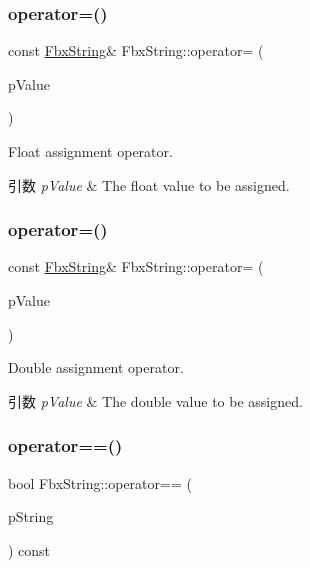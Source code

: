 \subsubsection{\texorpdfstring{operator=()}{operator=()}\hspace{0.1cm}{\footnotesize\ttfamily [5/6]}}
{\footnotesize\ttfamily const \hyperlink{class_fbx_string}{Fbx\+String}\& Fbx\+String\+::operator= (\begin{DoxyParamCaption}\item[{float}]{p\+Value }\end{DoxyParamCaption})}

Float assignment operator. 
\begin{DoxyParams}{引数}
{\em p\+Value} & The float value to be assigned. \\
\hline
\end{DoxyParams}
\mbox{\label{class_fbx_string_ae9c8c771a96386a2e21f31cf2fa0a5cc}} 
\subsubsection{\texorpdfstring{operator=()}{operator=()}\hspace{0.1cm}{\footnotesize\ttfamily [6/6]}}
{\footnotesize\ttfamily const \hyperlink{class_fbx_string}{Fbx\+String}\& Fbx\+String\+::operator= (\begin{DoxyParamCaption}\item[{double}]{p\+Value }\end{DoxyParamCaption})}

Double assignment operator. 
\begin{DoxyParams}{引数}
{\em p\+Value} & The double value to be assigned. \\
\hline
\end{DoxyParams}
\mbox{\label{class_fbx_string_aafbaa4e17d510d9027431cc94ac383ce}} 
\subsubsection{\texorpdfstring{operator==()}{operator==()}\hspace{0.1cm}{\footnotesize\ttfamily [1/2]}}
{\footnotesize\ttfamily bool Fbx\+String\+::operator== (\begin{DoxyParamCaption}\item[{const \hyperlink{class_fbx_string}{Fbx\+String} \&}]{p\+String }\end{DoxyParamCaption}) const}

